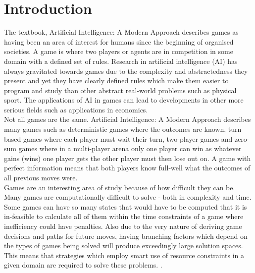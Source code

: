 \documentclass[journal]{IEEEtran}
\begin{document}
\section{Introduction}
  The textbook, Artificial Intelligence: A Modern Approach \cite{AIModern} describes games as having been an area of interest for humans since the beginning of organised societies. A game is where two players or agents are in competition in some domain with a defined set of rules. Research in artificial intelligence (AI) has always gravitated towards games due to the complexity and abstractedness they present and yet they have clearly defined rules which make them easier to program and study than other abstract real-world problems such as physical sport. The applications of AI in games can lead to developments in other more serious fields such as applications in economics. \\
  
  Not all games are the same. Artificial Intelligence: A Modern Approach \cite{AIModern} describes many games such as deterministic games where the outcomes are known, turn based games where each player must wait their turn, two-player games and zero-sum games where in a multi-player arena only one player can win as whatever gains (wins) one player gets the other player must then lose out on. A game with perfect information means that both players know full-well what the outcomes of all previous moves were. \\
  
  Games are an interesting area of study because of how difficult they can be. Many games are computationally difficult to solve - both in complexity and time. Some games can have so many states that would have to be computed that it is in-feasible to calculate all of them within the time constraints of a game where inefficiency could have penalties. Also due to the very nature of deriving game decisions and paths for future moves, having branching factors which depend on the types of games being solved will produce exceedingly large solution spaces. This means that strategies which employ smart use of resource constraints in a given domain are required to solve these problems. \cite{AIModern}. 
  
\end{document}
